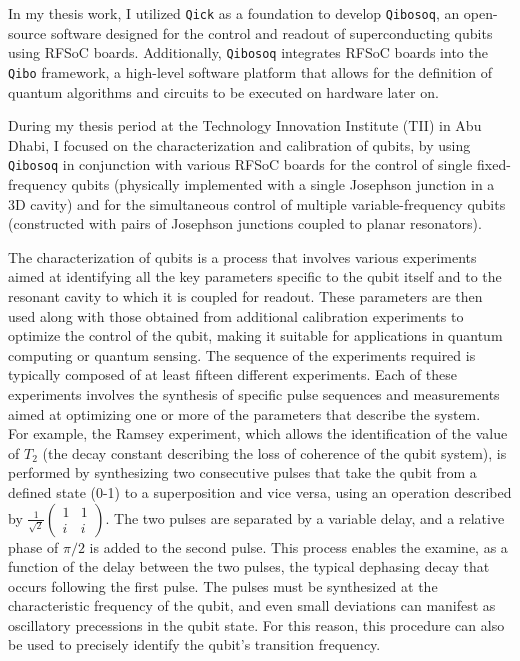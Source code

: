 \documentclass{article}
\newcommand{\Qibo}{\texttt{Qibo}\xspace}
\newcommand{\Qibosoq}{\texttt{Qibosoq}\xspace}
\newcommand{\Qick}{\texttt{Qick}\xspace}
\begin{document}
In my thesis work, I utilized \Qick as a foundation to develop \Qibosoq, an open-source software designed for the control and readout of superconducting qubits using RFSoC boards.
Additionally, \Qibosoq integrates RFSoC boards into the \Qibo framework, a high-level software platform that allows for the definition of quantum algorithms and circuits to be executed on hardware later on.

During my thesis period at the Technology Innovation Institute (TII) in Abu Dhabi, I focused on the characterization and calibration of qubits, by using \Qibosoq in conjunction with various RFSoC boards for the control of single fixed-frequency qubits (physically implemented with a single Josephson junction in a 3D cavity) and for the simultaneous control of multiple variable-frequency qubits (constructed with pairs of Josephson junctions coupled to planar resonators).

%
The characterization of qubits is a process that involves various experiments aimed at identifying all the key parameters specific to the qubit itself and to the resonant cavity to which it is coupled for readout.
These parameters are then used along with those obtained from additional calibration experiments to optimize the control of the qubit, making it suitable for applications in quantum computing or quantum sensing.
The sequence of the experiments required is typically composed of at least fifteen different experiments.
Each of these experiments involves the synthesis of specific pulse sequences and measurements aimed at optimizing one or more of the parameters that describe the system.\\
%
For example, the Ramsey experiment, which allows the identification of the value of \(T_2\) (the decay constant describing the loss of coherence of the qubit system), is performed by synthesizing two consecutive pulses that take the qubit from a defined state (0-1) to a superposition and vice versa, using an operation described by \(\frac{1}{\sqrt{2}}\begin{pmatrix}1 & 1 \\ i & i \end{pmatrix}\).
The two pulses are separated by a variable delay, and a relative phase of \(\pi/2\) is added to the second pulse.
%
This process enables the examine, as a function of the delay between the two pulses, the typical dephasing decay that occurs following the first pulse.
The pulses must be synthesized at the characteristic frequency of the qubit, and even small deviations can manifest as oscillatory precessions in the qubit state.
For this reason, this procedure can also be used to precisely identify the qubit's transition frequency.
\end{document}
